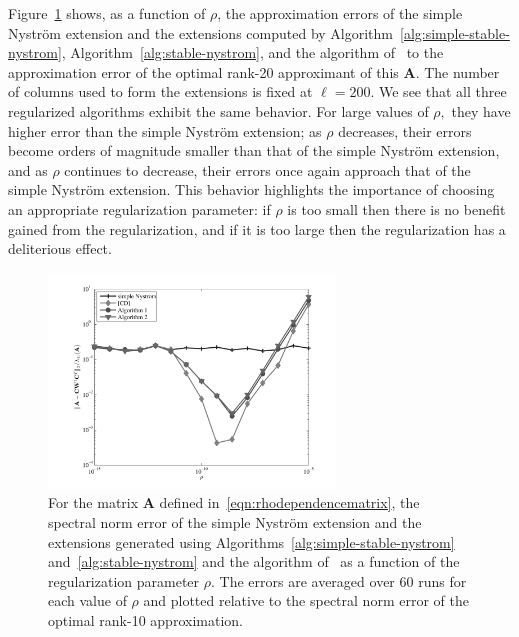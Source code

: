 \documentclass[11pt,letterpaper,twoside,reqno,nosumlimits]{amsart}
\newcommand{\mat}[1]{\ensuremath{\mathbf{#1}}}
\theoremstyle{remark}
\begin{document}
Figure~\ref{fig:regularization} shows, as a function of $\rho$, the approximation errors of the simple Nystr\"om extension and the extensions computed by Algorithm~\ref{alg:simple-stable-nystrom}, Algorithm~\ref{alg:stable-nystrom}, and the algorithm of~\cite{CD11} to the approximation error of the optimal rank-20 approximant of this $\mat{A}$. The number of columns used to form the extensions is fixed at $\ell = 200.$ We see that all three regularized algorithms exhibit the same behavior. For large values of $\rho,$ they have higher error than the simple Nystr\"om extension; as $\rho$ decreases, their errors become orders of magnitude smaller than that of the simple Nystr\"om extension, and as $\rho$ continues to decrease, their errors once again approach that of the simple Nystr\"om extension. This behavior highlights the importance of choosing an appropriate regularization parameter: if $\rho$ is too small then there is no benefit gained from the regularization, and if it is too large then the 
regularization has a deliterious effect.

\begin{figure}[ht]
 \centering
 \includegraphics[width=3in,keepaspectratio=true]{./experiments/regularizationdependence.pdf}
 \caption{For the matrix $\mat{A}$ defined in~\eqref{eqn:rhodependencematrix}, the spectral norm error of the simple Nystr\"om extension and the extensions generated using Algorithms~\ref{alg:simple-stable-nystrom} and~\ref{alg:stable-nystrom} and the algorithm of~\cite{CD11} as a function of the regularization parameter $\rho.$ The errors are averaged over 60 runs for each value of $\rho$ and plotted relative to the spectral norm error of the optimal rank-10 approximation.}
 \label{fig:regularization}
\end{figure}

\clearpage


\end{document}
